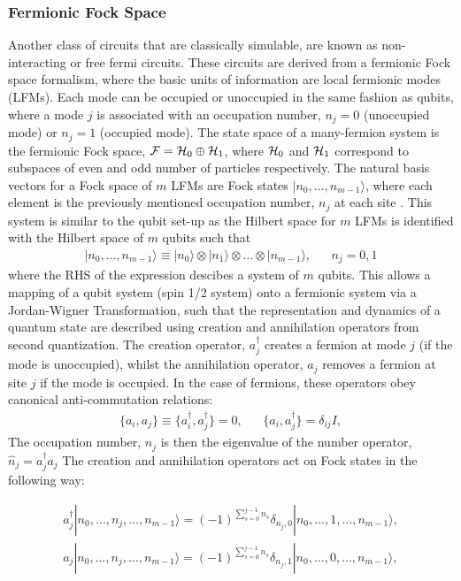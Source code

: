 \subsubsection{Fermionic Fock Space}
Another class of circuits that are classically simulable, are known as non-interacting or free fermi circuits.
These circuits are derived from a fermionic Fock space formalism, where the basic units of information are local
fermionic modes (LFMs). Each mode can be occupied or unoccupied in the same fashion as qubits, where
a mode $j$ is associated with an occupation number, $n_j = 0$ (unoccupied mode) or $n_j = 1$ (occupied mode).
The state space of a many-fermion system is the fermionic Fock space, ${\cal F} = {\cal H}_0 \oplus {\cal H}_1$,
where ${\cal H}_0$ and ${\cal H}_1$ correspond to subspaces of even and odd number of particles respectively.
The natural basis vectors for a Fock space of $m$ LFMs are Fock states $|n_0, \dots, n_{m-1}\rangle$,
where each element is the previously mentioned occupation number, $n_j$ at each site \cite{DeFelice2019}.
This system is similar to the qubit set-up as the Hilbert space for $m$ LFMs is identified with the Hilbert space
of $m$ qubits such that
\begin{align*}
    |n_0, \dots, n_{m-1}\rangle \equiv | n_0 \rangle \otimes | n_1 \rangle \otimes \dots \otimes | n_{m-1} \rangle, &  & n_j = 0,1
\end{align*}
where the RHS of the expression descibes a system of $m$ qubits. This allows a mapping of a qubit system (spin 1/2 system) onto
a fermionic system via a Jordan-Wigner Transformation, such that the representation and dynamics of a quantum
state are described using creation and annihilation operators from second quantization.
The creation operator, $a_j^{\dagger}$ creates a fermion at mode $j$ (if the mode is unoccupied),
whilst the annihilation operator, $a_j$ removes a fermion at site $j$ if the mode is occupied.
In the case of fermions, these operators obey canonical anti-commutation relations:
\begin{align}
    \{a_i, a_j\} \equiv \{a_i^{\dagger}, a_j^{\dagger}\} = 0, &  & \{a_i, a_j^{\dagger}\} = \delta_{ij}I,
\end{align}
The occupation number, $n_j$ is then the eigenvalue of the number operator, $\hat{n}_j = a^{\dagger}_j a_j$
The creation and annihilation operators act on Fock states in the following way:
\begin{widetext}
    \begin{align*}
        a_j^{\dagger} |n_0, \dots, n_j, \dots, n_{m-1}\rangle = (-1)^{\sum^{j-1}_{s=0}n_s}\delta_{n_j, 0}  |n_0, \dots, 1, \dots, n_{m-1}\rangle, \\
        a_j |n_0, \dots, n_j, \dots, n_{m-1}\rangle = (-1)^{\sum^{j-1}_{s=0}n_s}\delta_{n_j, 1}  |n_0, \dots, 0, \dots, n_{m-1}\rangle,
    \end{align*}
\end{widetext}

